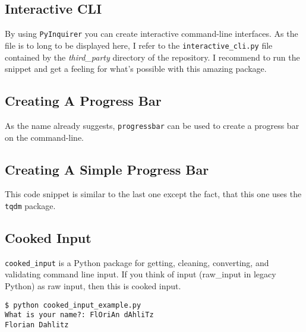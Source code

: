 \subsection{Interactive CLI}

By using \lstinline{PyInquirer} you can create interactive command-line interfaces.
As the file is to long to be displayed here, I refer to the \lstinline{interactive_cli.py} file contained by the \textit{third\_party} directory of the repository.
I recommend to run the snippet and get a feeling for what's possible with this amazing package.


\subsection{Creating A Progress Bar}

As the name already suggests, \lstinline{progressbar} can be used to create a progress bar on the command-line.




\subsection{Creating A Simple Progress Bar}

This code snippet is similar to the last one except the fact, that this one uses the \lstinline{tqdm} package.




\subsection{Cooked Input}

\glqq \lstinline{cooked_input} is a Python package for getting, cleaning, converting, and validating command line input.
If you think of input (raw\_input in legacy Python) as raw input, then this is cooked input.\grqq



\begin{lstlisting}[caption=Output of cooked\_input\_example.py]
$ python cooked_input_example.py
What is your name?: FlOriAn dAhliTz
Florian Dahlitz
\end{lstlisting}
